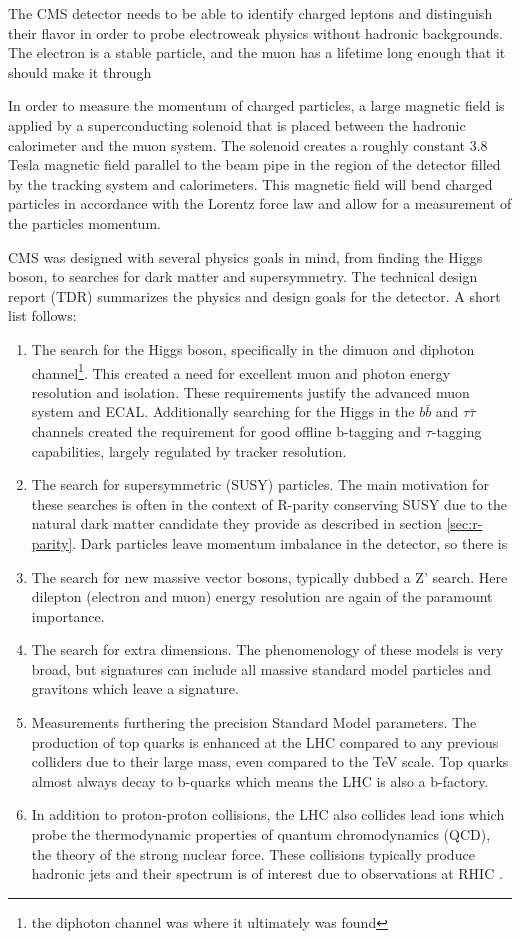   The CMS detector needs to be able to identify charged leptons and distinguish their flavor in order to probe electroweak physics without hadronic backgrounds. The electron is a stable particle, and the muon has a lifetime long enough that it should make it through

  In order to measure the momentum of charged particles, a large magnetic field is applied by a superconducting solenoid that is placed between the hadronic calorimeter and the muon system. The solenoid creates a roughly constant 3.8 Tesla magnetic field parallel to the beam pipe in the region of the detector filled by the tracking system and calorimeters. This magnetic field will bend charged particles in accordance with the Lorentz force law and allow for a measurement of the particles momentum.

  CMS was designed with several physics goals in mind, from finding the Higgs boson, to searches for dark matter and supersymmetry. The technical design report (TDR) \cite{cms_tdr} summarizes the physics and design goals for the detector. A short list follows:

  \begin{enumerate}
    \item The search for the Higgs boson, specifically in the dimuon and diphoton channel\footnote{the diphoton channel was where it ultimately was found}. This created a need for excellent muon and photon energy resolution and isolation. These requirements justify the advanced muon system and ECAL. Additionally searching for the Higgs in the $b\bar{b}$ and $\tau \bar{\tau}$ channels created the requirement for good offline b-tagging and $\tau$-tagging capabilities, largely regulated by tracker resolution.
    \item The search for supersymmetric (SUSY) particles. The main motivation for these searches is often in the context of R-parity conserving SUSY due to the natural dark matter candidate they provide as described in section \ref{sec:r-parity}. Dark particles leave momentum imbalance in the detector, so there is 
    \item The search for new massive vector bosons, typically dubbed a Z' search. Here dilepton (electron and muon) energy resolution are again of the paramount importance.
    \item The search for extra dimensions. The phenomenology of these models is very broad, but signatures can include all massive standard model particles and gravitons which leave a \MET signature.
    \item Measurements furthering the precision Standard Model parameters. The production of top quarks is enhanced at the LHC compared to any previous colliders due to their large mass, even compared to the TeV scale. Top quarks almost always decay to b-quarks which means the LHC is also a b-factory.
    \item In addition to proton-proton collisions, the LHC also collides lead ions which probe the thermodynamic properties of quantum chromodynamics (QCD), the theory of the strong nuclear force. These collisions typically produce hadronic jets and their \pt spectrum is of interest due to observations at RHIC \cite{QCD_collider_physics}.
  \end{enumerate}

